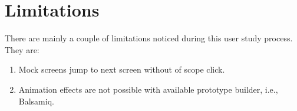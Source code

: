 \section{Limitations}

There are mainly a couple of limitations noticed during this user study process. They are: \\

\begin{enumerate}
\item Mock screens jump to next screen without of scope click.
\item Animation effects are not possible with available prototype builder, i.e., Balsamiq. 
\end{enumerate}